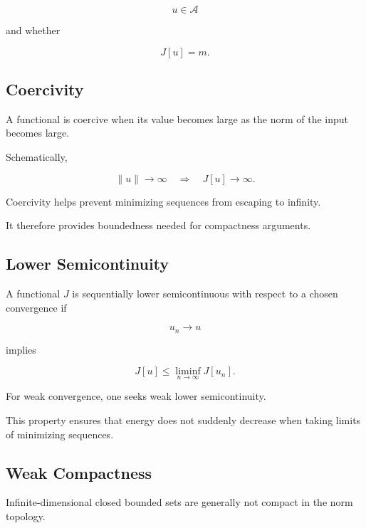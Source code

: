 \[
u\in\mathcal{A}
\]

and whether

\[
\boxed{
J[u]=m.
}
\]

\subsection{Coercivity}
\label{subsec:variational-coercivity}

A functional is coercive when its value becomes large as the norm of the
input becomes large.

Schematically,

\[
\boxed{
\|u\|\to\infty
\quad\Longrightarrow\quad
J[u]\to\infty.
}
\]

Coercivity helps prevent minimizing sequences from escaping to infinity.

It therefore provides boundedness needed for compactness arguments.

\subsection{Lower Semicontinuity}
\label{subsec:variational-lower-semicontinuity}

A functional \(J\) is sequentially lower semicontinuous with respect to a
chosen convergence if

\[
u_n\to u
\]

implies

\[
\boxed{
J[u]
\leq
\liminf_{n\to\infty}J[u_n].
}
\]

For weak convergence, one seeks weak lower semicontinuity.

This property ensures that energy does not suddenly decrease when taking
limits of minimizing sequences.

\subsection{Weak Compactness}
\label{subsec:variational-weak-compactness}

Infinite-dimensional closed bounded sets are generally not compact in
the norm topology.

